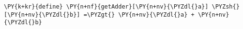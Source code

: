 \begin{Verbatim}[commandchars=\\\{\}]
\PY{k+kr}{define} \PY{n+nf}{getAdder}[\PY{n+nv}{\PYZdl{}a}] \PYZsh{}[\PY{n+nv}{\PYZdl{}b}] =\PYZgt{} \PY{n+nv}{\PYZdl{}a} + \PY{n+nv}{\PYZdl{}b}
\end{Verbatim}
